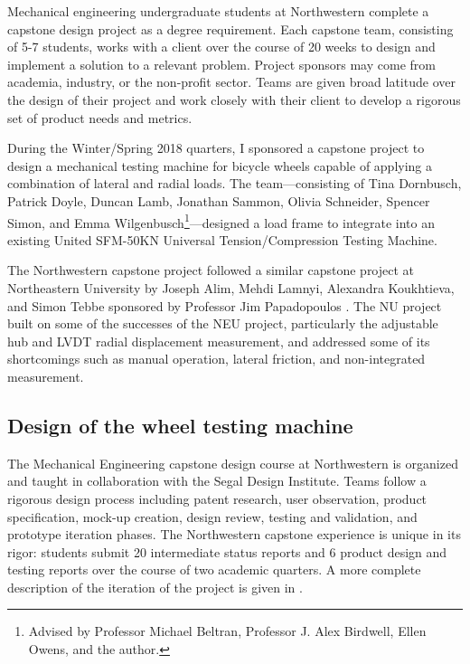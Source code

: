 \documentclass[\rootdir/thesis.tex]{subfiles}
\begin{document}
Mechanical engineering undergraduate students at Northwestern complete a capstone design project as a degree requirement. Each capstone team, consisting of 5-7 students, works with a client over the course of 20 weeks to design and implement a solution to a relevant problem. Project sponsors may come from academia, industry, or the non-profit sector. Teams are given broad latitude over the design of their project and work closely with their client to develop a rigorous set of product needs and metrics.

During the Winter/Spring 2018 quarters, I sponsored a capstone project to design a mechanical testing machine for bicycle wheels capable of applying a combination of lateral and radial loads. The team---consisting of Tina Dornbusch, Patrick Doyle, Duncan Lamb, Jonathan Sammon, Olivia Schneider, Spencer Simon, and Emma Wilgenbusch\footnote{Advised by Professor Michael Beltran, Professor J. Alex Birdwell, Ellen Owens, and the author.}---designed a load frame to integrate into an existing United SFM-50KN Universal Tension/Compression Testing Machine.

The Northwestern capstone project followed a similar capstone project at Northeastern University by Joseph Alim, Mehdi Lamnyi, Alexandra Koukhtieva, and Simon Tebbe sponsored by Professor Jim Papadopoulos \cite{Alim2016}. The NU project built on some of the successes of the NEU project, particularly the adjustable hub and LVDT radial displacement measurement, and addressed some of its shortcomings such as manual operation, lateral friction, and non-integrated measurement.

\subsection{Design of the wheel testing machine}

The Mechanical Engineering capstone design course at Northwestern is organized and taught in collaboration with the Segal Design Institute. Teams follow a rigorous design process including patent research, user observation, product specification, mock-up creation, design review, testing and validation, and prototype iteration phases. The Northwestern capstone experience is unique in its rigor: students submit 20 intermediate status reports and 6 product design and testing reports over the course of two academic quarters. A more complete description of the iteration of the project is given in \cite{WheelCats2018}.
\end{document}

